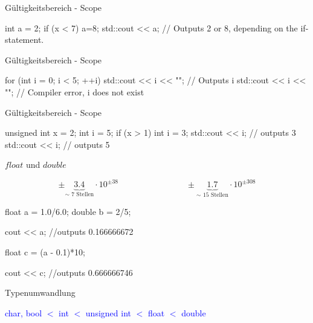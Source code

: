 \ifnum\conditionmacro=1 \documentclass[handout,usenames,dvipsnames]{beamer}\fi
\begin{document}
\begin{frame}[fragile]{Gültigkeitsbereich - Scope}
\begin{TFCpp}
int a = 2;
if (x < 7) {
a=8;
}
std::cout << a; // Outputs 2 or 8, depending on the if-statement.
\end{TFCpp}
\end{frame}


\begin{frame}[fragile]{Gültigkeitsbereich - Scope}
\begin{TFCpp}
for (int i = 0; i < 5; ++i) {
std::cout << i << "\n"; // Outputs i
}
std::cout << i << "\n"; // Compiler error, i does not exist
\end{TFCpp}
\end{frame}

\begin{frame}[fragile]{Gültigkeitsbereich - Scope}
\begin{TFCpp}
unsigned int x = 2;
int i = 5;
if (x > 1) {
int i = 3;
std::cout << i; // outputs 3
}
std::cout << i; // outputs 5
\end{TFCpp}
\end{frame}

\begin{frame}[fragile]{$float$ und $double$}

\vspace{-3ex}

\begin{equation*}
\pm \underbrace{3.4}_{\sim\text{ 7 Stellen}}\cdot 10^{\pm 38} \qquad\qquad\qquad\qquad\pm \underbrace{1.7}_{\sim\text{ 15 Stellen}}\cdot 10^{\pm 308}
\end{equation*}

\vspace{3ex}

\begin{TFCpp}
float a = 1.0/6.0;
double b = 2/5;

cout << a; //outputs 0.166666672

float c = (a - 0.1)*10;

cout << c; //outputs 0.666666746
\end{TFCpp}

\vfill

\end{frame}

\begin{frame}[fragile]{Typenumwandlung}
\begin{center}
\textcolor{blue}{char, bool $<$ int $<$ unsigned int $<$ float $<$ double}
\end{center}
\end{frame}
\end{document}
